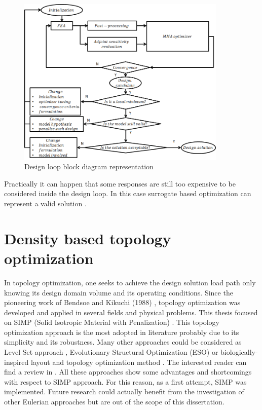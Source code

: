 \begin{figure}[ht]
\centering
\includegraphics[width=10cm]{images/Ch2/design_loop}
\caption{Design loop block diagram representation}
\label{fig.2.8}
\end{figure}
Practically it can happen that some responses are still too expensive to be considered inside the design loop. In this case surrogate based optimization can represent a valid solution \cite{forrester2008engineering}.
\section{Density based topology optimization}
\label{sec:2.2}
In topology optimization, one seeks to achieve the design solution load path only knowing its design domain volume and its operating conditions. Since the pioneering work of Bendsoe and Kikuchi (1988) \cite{bendsoe1988generating}, topology optimization was developed and applied in several fields and physical problems. This thesis focused on SIMP (Solid Isotropic Material with Penalization) \cite{bendsoe1989optimal}. This topology optimization approach is the most adopted in literature \cite{deaton2014survey} probably due to its simplicity and its robustness. Many other approaches could be considered as Level Set approach \cite{wang2003level}, Evolutionary Structural Optimization (ESO) \cite{xie1993simple} or biologically-inspired layout and topology optimization method \cite{kobayashi2010biologically}. The interested reader can find a review in \cite{deaton2014survey}. All these approaches show some advantages and shortcomings with respect to SIMP approach. For this reason, as a first attempt, SIMP was implemented. Future research could actually benefit from the investigation of other Eulerian approaches but are out of the scope of this dissertation.  

